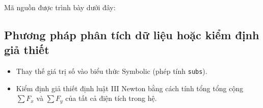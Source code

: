 Mã nguồn được trình bày dưới đây:


\subsection{Phương pháp phân tích dữ liệu hoặc kiểm định giả thiết}
\begin{itemize}[leftmargin=1.2cm]
    \item Thay thế giá trị số vào biểu thức Symbolic (phép tính \texttt{subs}).
    \item Kiểm định giả thiết định luật III Newton bằng cách tính tổng tổng cộng $\sum F_x$ và $\sum F_y$ của tất cả điện tích trong hệ.
\end{itemize}